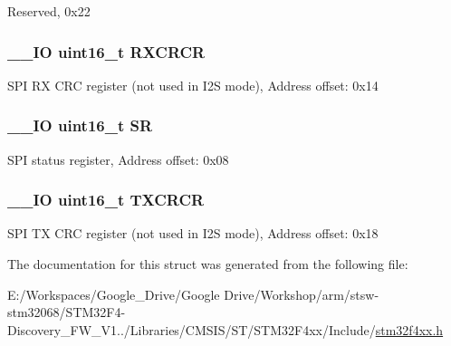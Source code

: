 Reserved, 0x22 \hypertarget{struct_s_p_i___type_def_a7ad53aa3735ccdd785e3eec02faf5eb9}{
\subsubsection[{R\-X\-C\-R\-C\-R}]{\setlength{\rightskip}{0pt plus 5cm}\-\_\-\-\_\-\-I\-O uint16\-\_\-t R\-X\-C\-R\-C\-R}}\label{struct_s_p_i___type_def_a7ad53aa3735ccdd785e3eec02faf5eb9}
S\-P\-I R\-X C\-R\-C register (not used in I2\-S mode), Address offset\-: 0x14 \hypertarget{struct_s_p_i___type_def_a44962ea5442d203bf4954035d1bfeb9d}{
\subsubsection[{S\-R}]{\setlength{\rightskip}{0pt plus 5cm}\-\_\-\-\_\-\-I\-O uint16\-\_\-t S\-R}}\label{struct_s_p_i___type_def_a44962ea5442d203bf4954035d1bfeb9d}
S\-P\-I status register, Address offset\-: 0x08 \hypertarget{struct_s_p_i___type_def_a0238d40f977d03709c97033b8379f98f}{
\subsubsection[{T\-X\-C\-R\-C\-R}]{\setlength{\rightskip}{0pt plus 5cm}\-\_\-\-\_\-\-I\-O uint16\-\_\-t T\-X\-C\-R\-C\-R}}\label{struct_s_p_i___type_def_a0238d40f977d03709c97033b8379f98f}
S\-P\-I T\-X C\-R\-C register (not used in I2\-S mode), Address offset\-: 0x18 

The documentation for this struct was generated from the following file\-:\begin{DoxyCompactItemize}
\item 
E\-:/\-Workspaces/\-Google\-\_\-\-Drive/\-Google Drive/\-Workshop/arm/stsw-\/stm32068/\-S\-T\-M32\-F4-\/\-Discovery\-\_\-\-F\-W\-\_\-\-V1../\-Libraries/\-C\-M\-S\-I\-S/\-S\-T/\-S\-T\-M32\-F4xx/\-Include/\hyperlink{stm32f4xx_8h}{stm32f4xx.\-h}\end{DoxyCompactItemize}
